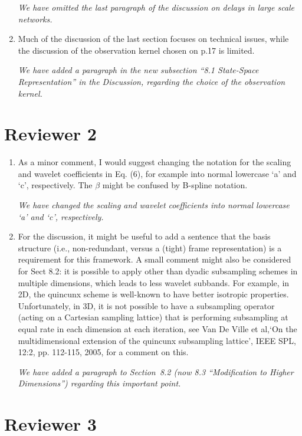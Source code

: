 \documentclass{article}
\begin{document}
\begin{enumerate}
		\emph{We have omitted the last paragraph of the discussion on delays in large scale networks.}
				
		\item Much of the discussion of the last section focuses on technical issues, while the discussion of the observation kernel chosen on p.17 is limited.
				
		\emph{We have added a paragraph in the new subsection ``8.1 State-Space Representation'' in the Discussion, regarding the choice of the observation kernel.}

    \end{enumerate}
    
    \section{Reviewer 2}
    
\begin{enumerate}
    \item As a minor comment, I would suggest changing the notation for the scaling and wavelet coefficients in Eq. (6), for example into normal lowercase `a' and `c', respectively. The $\beta$ might be confused by B-spline notation. 

	\emph{We have changed the scaling and wavelet coefficients into normal lowercase `a' and `c', respectively.}

\item For the discussion, it might be useful to add a sentence that the basis structure (i.e., non-redundant, versus a (tight) frame representation) is a requirement for this framework. A small comment might also be considered for Sect 8.2: it is possible to apply other than dyadic subsampling schemes in multiple dimensions, which leads to less wavelet subbands. For example, in 2D, the quincunx scheme is well-known to have better isotropic properties. Unfortunately, in 3D, it is not possible to have a subsampling operator (acting on a Cartesian sampling lattice) that is performing subsampling at equal rate in each dimension at each iteration, see Van De Ville et al,`On the multidimensional extension of the quincunx subsampling lattice', IEEE SPL, 12:2, pp.  112-115, 2005, for a comment on this. 

\emph{We have added a paragraph  to Section~8.2 (now 8.3 ``Modification to Higher Dimensions'') regarding this important point.}


\end{enumerate}  

    \section{Reviewer 3}  
\end{document}
